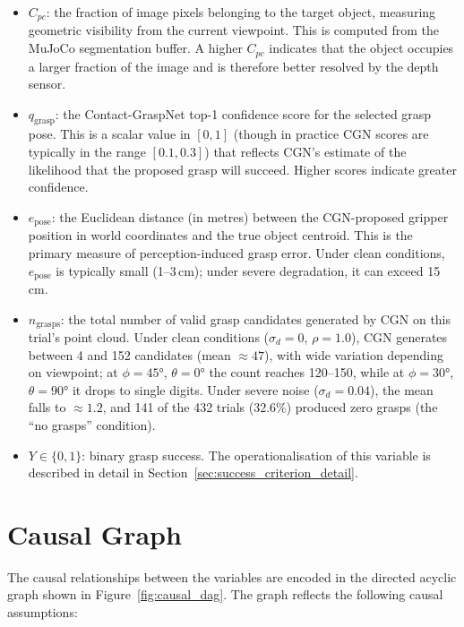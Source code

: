 \documentclass[11pt,a4paper]{report}
\begin{document}
\begin{itemize}
  \item $C_{pc}$: the fraction of image pixels belonging to the target object, measuring geometric visibility from the current viewpoint. This is computed from the MuJoCo segmentation buffer. A higher $C_{pc}$ indicates that the object occupies a larger fraction of the image and is therefore better resolved by the depth sensor.

  \item $q_{\text{grasp}}$: the Contact-GraspNet top-1 confidence score for the selected grasp pose. This is a scalar value in $[0, 1]$ (though in practice CGN scores are typically in the range $[0.1, 0.3]$) that reflects CGN's estimate of the likelihood that the proposed grasp will succeed. Higher scores indicate greater confidence.

  \item $e_{\text{pose}}$: the Euclidean distance (in metres) between the CGN-proposed gripper position in world coordinates and the true object centroid. This is the primary measure of perception-induced grasp error. Under clean conditions, $e_{\text{pose}}$ is typically small (1--3\,cm); under severe degradation, it can exceed 15\,cm.

  \item $n_{\text{grasps}}$: the total number of valid grasp candidates generated by CGN on this trial's point cloud. Under clean conditions ($\sigma_d = 0$, $\rho = 1.0$), CGN generates between 4 and 152 candidates (mean $\approx 47$), with wide variation depending on viewpoint; at $\phi = 45°$, $\theta = 0°$ the count reaches 120--150, while at $\phi = 30°$, $\theta = 90°$ it drops to single digits. Under severe noise ($\sigma_d = 0.04$), the mean falls to $\approx 1.2$, and 141 of the 432 trials (32.6\%) produced zero grasps (the ``no grasps'' condition).

  \item $Y \in \{0, 1\}$: binary grasp success. The operationalisation of this variable is described in detail in Section~\ref{sec:success_criterion_detail}.
\end{itemize}

\section{Causal Graph}
\label{sec:causal_graph}

The causal relationships between the variables are encoded in the directed acyclic graph shown in Figure~\ref{fig:causal_dag}. The graph reflects the following causal assumptions:
\end{document}
